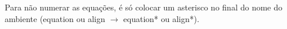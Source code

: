         Para não numerar as equações, é só colocar um asterisco no final do nome do ambiente (equation ou align $\rightarrow$ equation* ou align*).










